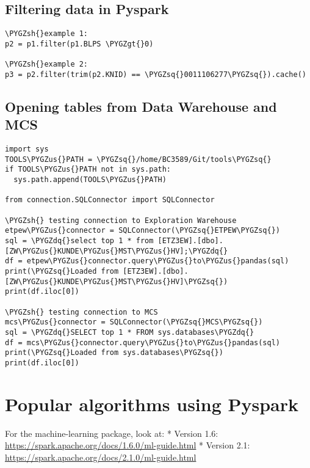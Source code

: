 \documentclass[letterpaper,10pt,english]{sphinxmanual}
\def\PYGZus{\char`\_}
\def\PYGZgt{\char`\>}
\def\PYGZsh{\char`\#}
\def\PYGZsq{\char`\'}
\def\PYGZdq{\char`\"}
\renewcommand\PYGZsq{\textquotesingle}
\begin{document}
\subsection{Filtering data in Pyspark}
\label{Pyspark_Documentation:filtering-data-in-pyspark}
\begin{Verbatim}[commandchars=\\\{\}]
\PYGZsh{}example 1:
p2 = p1.filter(p1.BLPS \PYGZgt{}0)

\PYGZsh{}example 2:
p3 = p2.filter(trim(p2.KNID) == \PYGZsq{}0011106277\PYGZsq{}).cache()
\end{Verbatim}


\subsection{Opening tables from Data Warehouse and MCS}
\label{Pyspark_Documentation:opening-tables-from-data-warehouse-and-mcs}
\begin{Verbatim}[commandchars=\\\{\}]
import sys
TOOLS\PYGZus{}PATH = \PYGZsq{}/home/BC3589/Git/tools\PYGZsq{}
if TOOLS\PYGZus{}PATH not in sys.path:
  sys.path.append(TOOLS\PYGZus{}PATH)

from connection.SQLConnector import SQLConnector

\PYGZsh{} testing connection to Exploration Warehouse
etpew\PYGZus{}connector = SQLConnector(\PYGZsq{}ETPEW\PYGZsq{})
sql = \PYGZdq{}select top 1 * from [ETZ3EW].[dbo].[ZW\PYGZus{}KUNDE\PYGZus{}MST\PYGZus{}HV];\PYGZdq{}
df = etpew\PYGZus{}connector.query\PYGZus{}to\PYGZus{}pandas(sql)
print(\PYGZsq{}Loaded from [ETZ3EW].[dbo].[ZW\PYGZus{}KUNDE\PYGZus{}MST\PYGZus{}HV]\PYGZsq{})
print(df.iloc[0])

\PYGZsh{} testing connection to MCS
mcs\PYGZus{}connector = SQLConnector(\PYGZsq{}MCS\PYGZsq{})
sql = \PYGZdq{}SELECT top 1 * FROM sys.databases\PYGZdq{}
df = mcs\PYGZus{}connector.query\PYGZus{}to\PYGZus{}pandas(sql)
print(\PYGZsq{}Loaded from sys.databases\PYGZsq{})
print(df.iloc[0])
\end{Verbatim}


\section{Popular algorithms using Pyspark}
\label{Pyspark_Documentation:popular-algorithms-using-pyspark}
For the machine-learning package, look at:
* Version 1.6: \href{https://spark.apache.org/docs/1.6.0/ml-guide.html}{https://spark.apache.org/docs/1.6.0/ml-guide.html}
* Version 2.1: \href{https://spark.apache.org/docs/2.1.0/ml-guide.html}{https://spark.apache.org/docs/2.1.0/ml-guide.html}
\end{document}
